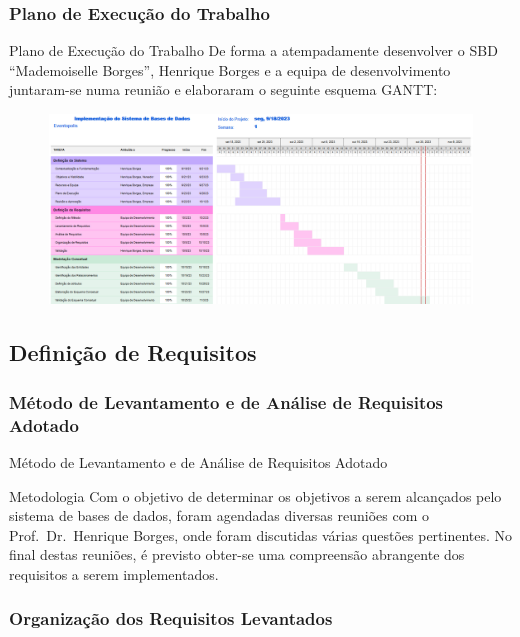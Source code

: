 \documentclass[compress,svgnames,handout,13.7pt]{beamer}
\begin{document}
\subsubsection{Plano de Execução do Trabalho}
\begin{frame}{Plano de Execução do Trabalho}
De forma a atempadamente desenvolver o SBD ``Mademoiselle Borges'', Henrique Borges e a equipa de desenvolvimento juntaram-se numa reuni\~ao e elaboraram o seguinte esquema GANTT:
\begin{figure}[h]
            \centering
            \includegraphics[width=4.75in]{images/GANTT1_c1.png}
        \end{figure}
\end{frame}

\subsection{Definição de Requisitos}

\subsubsection{Método de Levantamento e de Análise de Requisitos Adotado}
\begin{frame}{Método de Levantamento e de Análise de Requisitos Adotado}
\begin{block}{Metodologia}
Com o objetivo de determinar os objetivos a serem alcançados pelo sistema de bases de dados,
foram agendadas diversas reuniões com o Prof.\ Dr.\ Henrique Borges, onde foram discutidas várias
questões pertinentes. No final destas reuniões, é previsto obter-se uma compreensão abrangente
dos requisitos a serem implementados.

\end{block}
\end{frame}

\subsubsection{Organização dos Requisitos Levantados}
\end{document}
